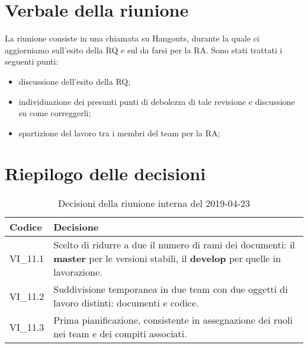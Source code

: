 \section{Verbale della riunione}
La riunione consiste in una chiamata su Hangouts, durante la quale ci aggiorniamo sull'esito della RQ e sul da farsi per la RA.
Sono stati trattati i seguenti punti:
\begin{itemize}
	\item discussione dell'esito della RQ;
	\item individuazione dei presunti punti di debolezza di tale revisione e discussione su come correggerli;
	\item spartizione del lavoro tra i membri del team per la RA;
	
\end{itemize}

\hspace{3cm}

\section{Riepilogo delle decisioni}

	
	\begin{longtable}{ >{\centering}p{} >{}p{}}
		\caption{Decisioni della riunione interna del 2019-04-23}\\	
		\rowcolorhead
		\textbf{\color{white}Codice} 
		& \centering\textbf{\color{white}Decisione} 
		\tabularnewline 
		\endfirsthead
		VI\_11.1 & Scelto di ridurre a due il numero di rami dei documenti: il \textbf{master} per le versioni stabili, il \textbf{develop} per quelle in lavorazione.
		\tabularnewline 
		VI\_11.2 & Suddivisione temporanea in due team con due oggetti di lavoro distinti: documenti e codice.
		\tabularnewline 
		VI\_11.3 & Prima pianificazione, consistente in assegnazione dei ruoli nei team e dei compiti associati.
		
	\end{longtable}
	




